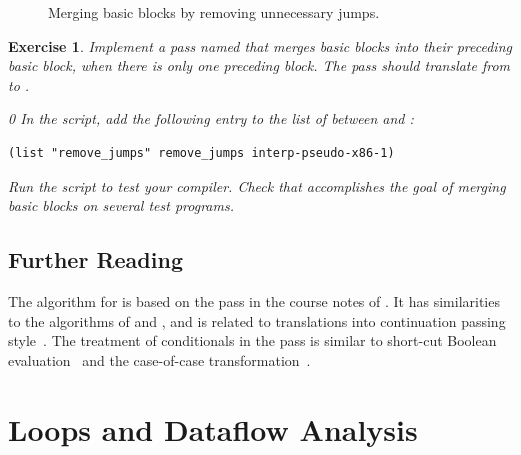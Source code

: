 \documentclass[7x10]{TimesAPriori_MIT}%
\def\racketEd{0}
\def\edition{1}
\newtheorem{exercise}[theorem]{Exercise}
\numberwithin{theorem}{chapter}
\numberwithin{definition}{chapter}
\numberwithin{equation}{chapter}
\begin{document}
\begin{figure}[tbp]
\caption{Merging basic blocks by removing unnecessary jumps.}
\label{fig:remove-jumps}
\end{figure}

\begin{exercise}\normalfont\normalsize
%
Implement a pass named  that merges basic blocks
into their preceding basic block, when there is only one preceding
block. The pass should translate from \LangXIfVar{} to \LangXIfVar{}.
%
{\if\edition\racketEd        
In the  script, add the following entry to the
list of  between 
and :
\begin{lstlisting}
(list "remove_jumps" remove_jumps interp-pseudo-x86-1)
\end{lstlisting}
\fi}
%
Run the script to test your compiler.
%
Check that  accomplishes the goal of merging basic
blocks on several test programs.
\end{exercise}

\section{Further Reading}
\label{sec:cond-further-reading}

The algorithm for  is based on the
 pass in the course notes of
\citet{Dybvig:2010aa}.
%
It has similarities to the algorithms of \citet{Danvy:2003fk} and
\citet{Appel:2003fk}, and is related to translations into continuation
passing
style~\citep{Wijngaarden:1966,Fischer:1972,reynolds72:_def_interp,Plotkin:1975,Friedman:2001}.
%
The treatment of conditionals in the  pass is
similar to short-cut Boolean
evaluation~\citep{Logothetis:1981,Aho:2006wb,Clarke:1989,Danvy:2003fk}
and the case-of-case transformation~\citep{PeytonJones:1998}.

\chapter{Loops and Dataflow Analysis}
\label{ch:Lwhile}
\setcounter{footnote}{0}


\end{document}
